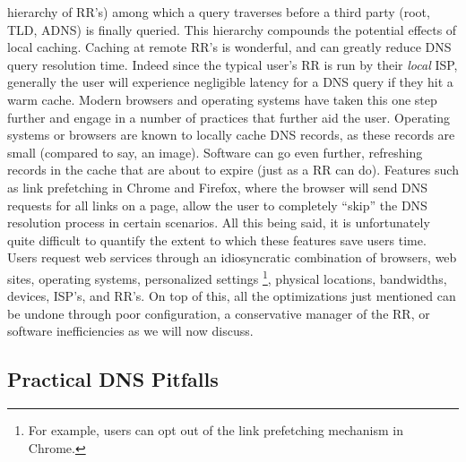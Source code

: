 \documentclass[sigconf,nonacm,10pt]{acmart}
\begin{document}
hierarchy of RR's) among which a query traverses before a third party
(root, TLD, ADNS) is finally queried. This hierarchy compounds the
potential effects of local caching. \break \break
Caching at remote RR's is wonderful, and can greatly reduce DNS query
resolution time. Indeed since the typical user's RR is run by their
\textit{local} ISP, generally the user will experience negligible
latency for a DNS query if they hit a warm cache. Modern browsers and
operating systems have taken this one step further and engage in a
number of practices that further aid the user. Operating systems or
browsers are known to locally cache DNS records, as these records are
small (compared to say, an image). Software can go even further,
refreshing records in the cache that are about to expire (just as a RR
can do). Features such as link prefetching in Chrome and Firefox, where
the browser will send DNS requests for all links on a page, allow the
user to completely ``skip'' the DNS resolution process in certain
scenarios. All this being said, it is unfortunately quite difficult to
quantify the extent to which these features save users time. Users
request web services through an idiosyncratic combination of browsers,
web sites, operating systems, personalized settings
\footnote{ For example, users can opt out of the link prefetching mechanism in Chrome. },
physical locations, bandwidths, devices, ISP's, and RR's. On top of
this, all the optimizations just mentioned can be undone through poor
configuration, a conservative manager of the RR, or software
inefficiencies as we will now discuss.

\subsection{Practical DNS Pitfalls}\label{practical-dns-pitfalls-1}
\end{document}
